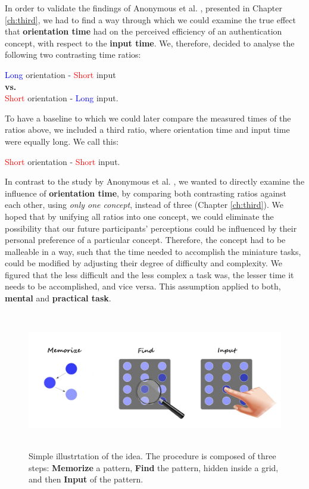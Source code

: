 In order to validate the findings of Anonymous et al. \cite{anonymous}, presented in Chapter \ref{ch:third}, we had to find a way through which we could examine the true effect that \textbf{orientation time} had on the perceived efficiency of an authentication concept, with respect to the \textbf{input time}. We, therefore, decided to analyse the following two contrasting time ratios: 
\begin{center}
    \textcolor{blue}{Long} orientation - \textcolor{red}{Short} input \\
    \textbf{vs.} \\
    \textcolor{red}{Short} orientation - \textcolor{blue}{Long} input.
\end{center} 

To have a baseline to which we could later compare the measured times of the ratios above, we included a third ratio, where orientation time and input time were equally long. We call this:  
\begin{center}
\textcolor{red}{Short} orientation - \textcolor{red}{Short} input.
\end{center} 

In contrast to the study by Anonymous et al. \cite{anonymous}, we wanted to directly examine the influence of \textbf{orientation time}, by comparing both contrasting ratios against each other, using \textit{only one concept}, instead of three (Chapter \ref{ch:third}). We hoped that by unifying all ratios into one concept, we could eliminate the possibility that our future participants' perceptions could be influenced by their personal preference of a particular concept. Therefore, the concept had to be malleable in a way, such that the time needed to accomplish the miniature tasks, could be modified by adjusting their degree of difficulty and complexity. We figured that the less difficult and the less complex a task was, the lesser time it needs to be accomplished, and vice versa. This assumption applied to both, \textbf{mental} and \textbf{practical task}.

\begin{figure}[t!]
\centering
\includegraphics[width=15cm, height=6cm]{Chapters/graphics/ConceptIdea.jpeg}
\caption{Simple illustrtation of the idea. The procedure is composed of three steps: \textbf{Memorize} a pattern, \textbf{Find} the pattern, hidden inside a grid, and then \textbf{Input} of the pattern.}
\label{fig:concept}
\end{figure}

